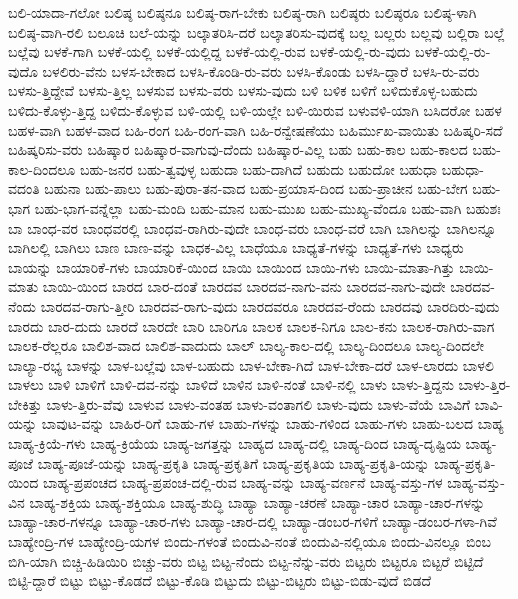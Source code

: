 {ಬಲಿ-ಯಾದಾ-ಗಲೋ
ಬಲಿಷ್ಠ
ಬಲಿಷ್ಠನೂ
ಬಲಿಷ್ಠ-ರಾಗ-ಬೇಕು
ಬಲಿಷ್ಠ-ರಾಗಿ
ಬಲಿಷ್ಠರು
ಬಲಿಷ್ಠರೂ
ಬಲಿಷ್ಠ-ಳಾಗಿ
ಬಲಿಷ್ಠ-ವಾಗಿ-ರಲಿ
ಬಲೂಚಿ
ಬಲೆ-ಯನ್ನು
ಬಲ್ಕಾತರಿಸಿ-ದರೆ
ಬಲ್ಕಾತರಿಸು-ವುದಕ್ಕೆ
ಬಲ್ಲ
ಬಲ್ಲರು
ಬಲ್ಲವು
ಬಲ್ಲಿರಾ
ಬಲ್ಲೆ
ಬಲ್ಲೆವು
ಬಳಕೆ-ಗಾಗಿ
ಬಳಕೆ-ಯಲ್ಲಿ
ಬಳಕೆ-ಯಲ್ಲಿದ್ದ
ಬಳಕೆ-ಯಲ್ಲಿ-ರುವ
ಬಳಕೆ-ಯಲ್ಲಿ-ರು-ವುದು
ಬಳಕೆ-ಯಲ್ಲಿ-ರು-ವುದೊ
ಬಳಲಿರು-ವೆನು
ಬಳಸ-ಬೇಕಾದ
ಬಳಸಿ-ಕೊಂಡಿ-ರು-ವರು
ಬಳಸಿ-ಕೊಂಡು
ಬಳಸಿ-ದ್ದಾರೆ
ಬಳಸಿ-ರು-ವರು
ಬಳಸು-ತ್ತಿದ್ದೇವೆ
ಬಳಸು-ತ್ತಿಲ್ಲ
ಬಳಸುವ
ಬಳಸು-ವರು
ಬಳಸು-ವುದು
ಬಳಿ
ಬಳಿಕ
ಬಳಿಗೆ
ಬಳಿದುಕೊಳ್ಳ-ಬಹುದು
ಬಳಿದು-ಕೊಳ್ಳು-ತ್ತಿದ್ದ
ಬಳಿದು-ಕೊಳ್ಳುವ
ಬಳಿ-ಯಲ್ಲಿ
ಬಳಿ-ಯಲ್ಲೇ
ಬಳಿ-ಯಿರುವ
ಬಳುವಳಿ-ಯಾಗಿ
ಬಸಿದರೋ
ಬಹಳ
ಬಹಳ-ವಾಗಿ
ಬಹಳ-ವಾದ
ಬಹಿ-ರಂಗ
ಬಹಿ-ರಂಗ-ವಾಗಿ
ಬಹಿ-ರನ್ವೇಷಣೆಯು
ಬಹಿರ್ಮುಖ-ವಾಯಿತು
ಬಹಿಷ್ಕರಿ-ಸದೆ
ಬಹಿಷ್ಕರಿಸು-ವರು
ಬಹಿಷ್ಕಾರ
ಬಹಿಷ್ಕಾರ-ವಾಗುವು-ದೆಂದು
ಬಹಿಷ್ಕಾರ-ವಿಲ್ಲ
ಬಹು
ಬಹು-ಕಾಲ
ಬಹು-ಕಾಲದ
ಬಹು-ಕಾಲ-ದಿಂದಲೂ
ಬಹು-ಜನರ
ಬಹು-ತ್ವವುಳ್ಳ
ಬಹುದಾ
ಬಹು-ದಾಗಿದೆ
ಬಹುದು
ಬಹುದೋ
ಬಹುಧಾ
ಬಹುಧಾ-ವದಂತಿ
ಬಹುನಾ
ಬಹು-ಪಾಲು
ಬಹು-ಪುರಾ-ತನ-ವಾದ
ಬಹು-ಪ್ರಯಾಸ-ದಿಂದ
ಬಹು-ಪ್ರಾಚೀನ
ಬಹು-ಬೇಗ
ಬಹು-ಭಾಗ
ಬಹು-ಭಾಗ-ವನ್ನೆಲ್ಲಾ
ಬಹು-ಮಂದಿ
ಬಹು-ಮಾನ
ಬಹು-ಮುಖ
ಬಹು-ಮುಖ್ಯ-ವೆಂದೂ
ಬಹು-ವಾಗಿ
ಬಹುಶಃ
ಬಾ
ಬಾಂಧ-ವರ
ಬಾಂಧವರಲ್ಲಿ
ಬಾಂಧವ-ರಾಗಿರು-ವುದೇ
ಬಾಂಧ-ವರು
ಬಾಂಧ-ವರೆ
ಬಾಗಿ
ಬಾಗಿಲನ್ನು
ಬಾಗಿಲನ್ನೂ
ಬಾಗಿಲಲ್ಲಿ
ಬಾಗಿಲು
ಬಾಣ
ಬಾಣ-ವನ್ನು
ಬಾಧಕ-ವಿಲ್ಲ
ಬಾಧೆಯೂ
ಬಾಧ್ಯತೆ-ಗಳನ್ನು
ಬಾಧ್ಯತೆ-ಗಳು
ಬಾಧ್ಯರು
ಬಾಯನ್ನು
ಬಾಯಾರಿಕೆ-ಗಳು
ಬಾಯಾರಿಕೆ-ಯಿಂದ
ಬಾಯಿ
ಬಾಯಿಂದ
ಬಾಯಿ-ಗಳು
ಬಾಯಿ-ಮಾತಾ-ಗಿತ್ತು
ಬಾಯಿ-ಮಾತು
ಬಾಯಿ-ಯಿಂದ
ಬಾರದ
ಬಾರ-ದಂತೆ
ಬಾರದವ
ಬಾರದವ-ನಾಗು-ವನು
ಬಾರದವ-ನಾಗು-ವುದೇ
ಬಾರದವ-ನೆಂದು
ಬಾರದವ-ರಾಗು-ತ್ತೀರಿ
ಬಾರದವ-ರಾಗು-ವುದು
ಬಾರದವರೂ
ಬಾರದವ-ರೆಂದು
ಬಾರದವು
ಬಾರದಿರು-ವುದು
ಬಾರದು
ಬಾರ-ದುದು
ಬಾರದೆ
ಬಾರದೇ
ಬಾರಿ
ಬಾರಿಗೂ
ಬಾಲಕ
ಬಾಲಕ-ನಿಗೂ
ಬಾಲ-ಕನು
ಬಾಲಕ-ರಾಗಿರು-ವಾಗ
ಬಾಲಕ-ರೆಲ್ಲರೂ
ಬಾಲಿಶ-ವಾದ
ಬಾಲಿಶ-ವಾದುದು
ಬಾಲ್
ಬಾಲ್ಯ-ಕಾಲ-ದಲ್ಲಿ
ಬಾಲ್ಯ-ದಿಂದಲೂ
ಬಾಲ್ಯ-ದಿಂದಲೇ
ಬಾಲ್ಯಾ-ರಭ್ಯ
ಬಾಳನ್ನು
ಬಾಳ-ಬಲ್ಲೆವು
ಬಾಳ-ಬಹುದು
ಬಾಳ-ಬೇಕಾ-ಗಿದೆ
ಬಾಳ-ಬೇಕಾ-ದರೆ
ಬಾಳ-ಲಾರದು
ಬಾಳಲಿ
ಬಾಳಲು
ಬಾಳಿ
ಬಾಳಿಗೆ
ಬಾಳಿ-ದವ-ನನ್ನು
ಬಾಳಿದೆ
ಬಾಳಿನ
ಬಾಳಿ-ನಂತೆ
ಬಾಳಿ-ನಲ್ಲಿ
ಬಾಳು
ಬಾಳು-ತ್ತಿದ್ದನು
ಬಾಳು-ತ್ತಿರ-ಬೇಕಿತ್ತು
ಬಾಳು-ತ್ತಿರು-ವೆವು
ಬಾಳುವ
ಬಾಳು-ವಂತಹ
ಬಾಳು-ವಂತಾಗಲಿ
ಬಾಳು-ವುದು
ಬಾಳು-ವೆಯೆ
ಬಾವಿಗೆ
ಬಾವಿ-ಯನ್ನು
ಬಾವುಟ-ವನ್ನು
ಬಾಹಿರ-ರಿಗೆ
ಬಾಹು-ಗಳ
ಬಾಹು-ಗಳನ್ನು
ಬಾಹು-ಗಳಿಂದ
ಬಾಹು-ಗಳು
ಬಾಹು-ಬಲದ
ಬಾಹ್ಯ
ಬಾಹ್ಯ-ಕ್ರಿಯೆ-ಗಳು
ಬಾಹ್ಯ-ಕ್ರಿಯೆಯ
ಬಾಹ್ಯ-ಜಗತ್ತನ್ನು
ಬಾಹ್ಯದ
ಬಾಹ್ಯ-ದಲ್ಲಿ
ಬಾಹ್ಯ-ದಿಂದ
ಬಾಹ್ಯ-ದೃಷ್ಟಿಯ
ಬಾಹ್ಯ-ಪೂಜೆ
ಬಾಹ್ಯ-ಪೂಜೆ-ಯನ್ನು
ಬಾಹ್ಯ-ಪ್ರಕೃತಿ
ಬಾಹ್ಯ-ಪ್ರಕೃತಿಗೆ
ಬಾಹ್ಯ-ಪ್ರಕೃತಿಯ
ಬಾಹ್ಯ-ಪ್ರಕೃತಿ-ಯನ್ನು
ಬಾಹ್ಯ-ಪ್ರಕೃತಿ-ಯಿಂದ
ಬಾಹ್ಯ-ಪ್ರಪಂಚದ
ಬಾಹ್ಯ-ಪ್ರಪಂಚ-ದಲ್ಲಿ-ರುವ
ಬಾಹ್ಯ-ವನ್ನು
ಬಾಹ್ಯ-ವರ್ಣನೆ
ಬಾಹ್ಯ-ವಸ್ತು-ಗಳ
ಬಾಹ್ಯ-ವಸ್ತು-ವಿನ
ಬಾಹ್ಯ-ಶಕ್ತಿಯ
ಬಾಹ್ಯ-ಶಕ್ತಿಯೂ
ಬಾಹ್ಯ-ಶುದ್ಧಿ
ಬಾಹ್ಯಾ
ಬಾಹ್ಯಾ-ಚರಣೆ
ಬಾಹ್ಯಾ-ಚಾರ
ಬಾಹ್ಯಾ-ಚಾರ-ಗಳನ್ನು
ಬಾಹ್ಯಾ-ಚಾರ-ಗಳನ್ನೂ
ಬಾಹ್ಯಾ-ಚಾರ-ಗಳು
ಬಾಹ್ಯಾ-ಚಾರ-ದಲ್ಲಿ
ಬಾಹ್ಯಾ-ಡಂಬರ-ಗಳಿಗೆ
ಬಾಹ್ಯಾ-ಡಂಬರ-ಗಳಾ-ಗಿವೆ
ಬಾಹ್ಯೇಂದ್ರಿ-ಗಳ
ಬಾಹ್ಯೇಂದ್ರಿ-ಯಗಳ
ಬಿಂದು-ಗಳಂತೆ
ಬಿಂದುವಿ-ನಂತೆ
ಬಿಂದುವಿ-ನಲ್ಲಿಯೂ
ಬಿಂದು-ವಿನಲ್ಲೂ
ಬಿಂಬ
ಬಿಗಿ-ಯಾಗಿ
ಬಿಚ್ಚಿ-ಹಿಡಿಯಿರಿ
ಬಿಚ್ಚು-ವರು
ಬಿಟ್ಟ
ಬಿಟ್ಟ-ನೆಂದು
ಬಿಟ್ಟ-ನೆನ್ನು-ವರು
ಬಿಟ್ಟರು
ಬಿಟ್ಟರೂ
ಬಿಟ್ಟರೆ
ಬಿಟ್ಟಿದೆ
ಬಿಟ್ಟಿ-ದ್ದಾರೆ
ಬಿಟ್ಟು
ಬಿಟ್ಟು-ಕೊಡದೆ
ಬಿಟ್ಟು-ಕೊಡಿ
ಬಿಟ್ಟುದು
ಬಿಟ್ಟು-ಬಿಟ್ಟರು
ಬಿಟ್ಟು-ಬಿಡು-ವುದೆ
ಬಿಡದೆ
}
